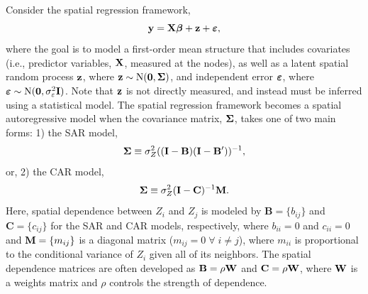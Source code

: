 \documentclass[11pt, titlepage]{article}\usepackage[]{graphicx}\usepackage[]{color}
\begin{document}
\begin{spacing}{1.9}
\begin{flushleft}
Consider the spatial regression framework, 
\begin{equation}
  \mathbf{y} = \mathbf{X}\mbox{\boldmath $\beta$} + \mathbf{z}  + \mbox{\boldmath $\varepsilon$},
  \label{eq:ArealFramework}
\end{equation}
where the goal is to model a first-order mean structure that includes covariates (i.e., predictor variables, $\mathbf{X}$, measured at the nodes), as well as a latent spatial random process $\mathbf{z}$, where $\mathbf{z} \sim \textrm{N}(\mathbf{0},\mbox{\boldmath $\Sigma$})$, and independent error $\mbox{\boldmath $\varepsilon$}$, where $\mbox{\boldmath $\varepsilon$} \sim \textrm{N}(\mathbf{0},\sigma^2_\varepsilon \mathbf{I})$. Note that $\mathbf{z}$ is not directly measured, and instead must be inferred using a statistical model. The spatial regression framework becomes a spatial autoregressive model when the covariance matrix, $\mbox{\boldmath $\Sigma$}$, takes one of two main forms: 1) the SAR model,
\begin{equation} \label{eq:SARcov}
  \mbox{\boldmath $\Sigma$} \equiv \sigma^2_Z ((\mathbf{I}-\mathbf{B})(\mathbf{I}-\mathbf{B}^{\prime}))^{-1},
\end{equation}
or, 2) the CAR model,
\begin{equation} \label{eq:CARcov}
  \mbox{\boldmath $\Sigma$} \equiv \sigma^2_Z (\mathbf{I}-\mathbf{C})^{-1}\mathbf{M}.
\end{equation}
Here, spatial dependence between $Z_i$ and $Z_j$ is modeled by $\mathbf{B} = \{b_{ij}\}$ and $\mathbf{C} = \{c_{ij}\}$ for the SAR and CAR models, respectively, where $b_{ii} = 0$ and $c_{ii} = 0$ and $\mathbf{M} = \{m_{ij}\}$ is a diagonal matrix ($m_{ij} = 0 \; \forall \; i \neq j$), where $m_{ii}$ is proportional to the conditional variance of $Z_i$ given all of its neighbors. The spatial dependence matrices are often developed as $\mathbf{B} = \rho\mathbf{W}$ and $\mathbf{C} = \rho\mathbf{W}$, where $\mathbf{W}$ is a weights matrix and $\rho$ controls the strength of dependence.


\end{flushleft}
\end{spacing}
\end{document}
